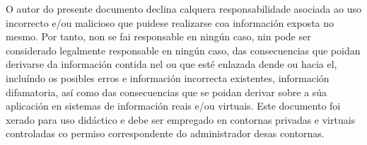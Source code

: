 \documentclass[a4paper]{article}
\begin{document}
\begin{titlepage}
\begin{comment}
          \node [blockRounder, fill=orange!20, right of=three] (four) {\begin{tabular}{c}winrm\\flag user.txt\end{tabular}};
          \node [blockRounder, fill=yellow!20, right of=four] (five) {ps1};
          \node [blockRounder, fill=pink!20, right of=five] (six) {bloodhound};
          \node [blockRounder, fill=brown!20, below of=five] (seven) {gmsapassword};
          \node [blockRounder, fill=violet!20, left of=seven] (eight) {ps1};
          \node [blockRounder, fill=red!60, left of=eight] (nine) {\begin{tabular}{c}flag\\root.txt\end{tabular}};
          \path [connector] (start) -- (one);
          \path [connector] (one) -- (two);
          \path [connector] (two) -- (three);
          \path [connector] (three) -- (four);
          \path [connector] (four) -- (five);
          \path [connector] (five) -- (six);
          \path [connector] (six) |- (seven);
          \path [connector] (seven) -- (eight);
          \path [connector] (eight) -- (nine);
          \end{tikzpicture}
        \end{comment}
        \vspace*{-0.4cm} 
        \begin{tcolorbox}[enhanced,attach boxed title to top center={yshift=-1mm,yshifttext=-1mm},
        colback=red!5!white,colframe=red!75!black,colbacktitle=red!90!black,
  title=LIMITACIÓN DE RESPONSABILIDADE,fonttitle=\bfseries,
  boxed title style={size=small,colframe=red!75!black} ]
               O autor do presente documento declina calquera responsabilidade asociada ao uso incorrecto e/ou malicioso que puidese realizarse coa información exposta no mesmo. Por tanto, non se fai responsable en ningún caso, nin pode ser considerado legalmente responsable en ningún caso, das consecuencias que poidan derivarse da información contida nel ou que esté enlazada dende ou hacia el, incluíndo os posibles erros e información incorrecta existentes, información difamatoria, así como das consecuencias que se poidan derivar sobre a súa aplicación en sistemas de información reais e/ou virtuais. Este documento foi xerado para uso didáctico e debe ser empregado en contornas privadas e virtuais controladas co permiso correspondente do administrador desas contornas.
        \end{tcolorbox}

\end{titlepage}
\end{document}
